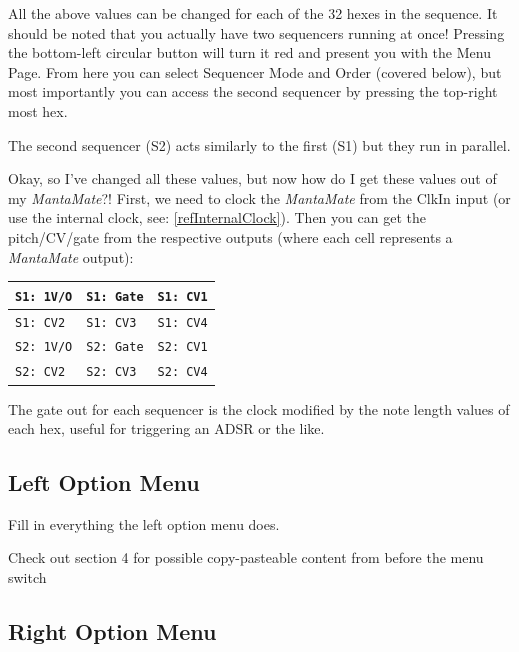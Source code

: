   All the above values can be changed for each of the 32 hexes in the
  sequence. It should be noted that you actually have two sequencers running
  at once! Pressing the bottom-left circular button will turn it red and present
  you with the Menu Page. From here you can select Sequencer Mode and Order
  (covered below), but most importantly you can access the second sequencer by
  pressing the top-right most hex.

  The second sequencer (S2) acts similarly to the first (S1) but they run in parallel.

  Okay, so I've changed all these values, but now how do I get these values out of my
  \emph{MantaMate}?! First, we need to clock the \emph{MantaMate} from the ClkIn input
  (or use the internal clock, see: \ref{refInternalClock}).
  Then you can get the pitch/CV/gate from the respective outputs (where each cell
  represents a \emph{MantaMate} output):

  \begin{center}
  \begin{tabular}{ | m{1.5cm} | m{1.5cm}| m{1.5cm} | }
    \hline
    \texttt{S1: 1V/O} & \texttt{S1: Gate} & \texttt{S1: CV1} \\
    \hline
    \texttt{S1: CV2} & \texttt{S1: CV3} & \texttt{S1: CV4} \\
    \hline
    \texttt{S2: 1V/O} & \texttt{S2: Gate} & \texttt{S2: CV1} \\
    \hline
    \texttt{S2: CV2} & \texttt{S2: CV3} & \texttt{S2: CV4} \\
    \hline
  \end{tabular}
  \end{center}

  The gate out for each sequencer is the clock modified
  by the note length values of each hex, useful for triggering an ADSR or the like.


  \subsection{Left Option Menu}

  Fill in everything the left option menu does.

  Check out section 4 for possible copy-pasteable content from before the menu switch

  \subsection{Right Option Menu}

